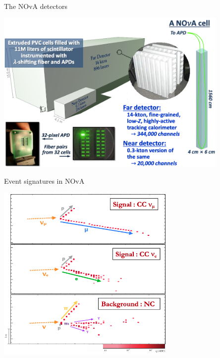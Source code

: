 \begin{frame}{The NOvA detectors}

  \begin{center}
   \includegraphics[width=0.85\textwidth]{./images/3nu/accelerator/nova_detectors}
  \end{center}

\end{frame}

%
%
%

\begin{frame}{Event signatures in NOvA}
\begin{center}
  \includegraphics[width=0.65\textwidth]{./images/3nu/accelerator/nova_events}
\end{center}
\end{frame}


%
%
%

